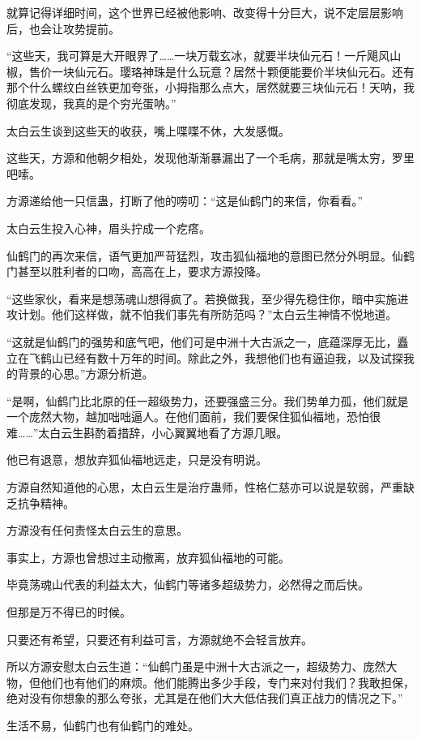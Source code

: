\begin{this_body}
就算记得详细时间，这个世界已经被他影响、改变得十分巨大，说不定层层影响后，也会让攻势提前。

“这些天，我可算是大开眼界了……一块万载玄冰，就要半块仙元石！一斤飓风山椒，售价一块仙元石。璎珞神珠是什么玩意？居然十颗便能要价半块仙元石。还有那个什么螺纹白丝铁更加夸张，小拇指那么点大，居然就要三块仙元石！天呐，我彻底发现，我真的是个穷光蛋呐。”

太白云生谈到这些天的收获，嘴上喋喋不休，大发感慨。

这些天，方源和他朝夕相处，发现他渐渐暴漏出了一个毛病，那就是嘴太穷，罗里吧嗦。

方源递给他一只信蛊，打断了他的唠叨：“这是仙鹤门的来信，你看看。”

太白云生投入心神，眉头拧成一个疙瘩。

仙鹤门的再次来信，语气更加严苛猛烈，攻击狐仙福地的意图已然分外明显。仙鹤门甚至以胜利者的口吻，高高在上，要求方源投降。

“这些家伙，看来是想荡魂山想得疯了。若换做我，至少得先稳住你，暗中实施进攻计划。他们这样做，就不怕我们事先有所防范吗？”太白云生神情不悦地道。

“这就是仙鹤门的强势和底气吧，他们可是中洲十大古派之一，底蕴深厚无比，矗立在飞鹤山已经有数十万年的时间。除此之外，我想他们也有逼迫我，以及试探我的背景的心思。”方源分析道。

“是啊，仙鹤门比北原的任一超级势力，还要强盛三分。我们势单力孤，他们就是一个庞然大物，越加咄咄逼人。在他们面前，我们要保住狐仙福地，恐怕很难……”太白云生斟酌着措辞，小心翼翼地看了方源几眼。

他已有退意，想放弃狐仙福地远走，只是没有明说。

方源自然知道他的心思，太白云生是治疗蛊师，性格仁慈亦可以说是软弱，严重缺乏抗争精神。

方源没有任何责怪太白云生的意思。

事实上，方源也曾想过主动撤离，放弃狐仙福地的可能。

毕竟荡魂山代表的利益太大，仙鹤门等诸多超级势力，必然得之而后快。

但那是万不得已的时候。

只要还有希望，只要还有利益可言，方源就绝不会轻言放弃。

所以方源安慰太白云生道：“仙鹤门虽是中洲十大古派之一，超级势力、庞然大物，但他们也有他们的麻烦。他们能腾出多少手段，专门来对付我们？我敢担保，绝对没有你想象的那么夸张，尤其是在他们大大低估我们真正战力的情况之下。”

生活不易，仙鹤门也有仙鹤门的难处。


\end{this_body}
